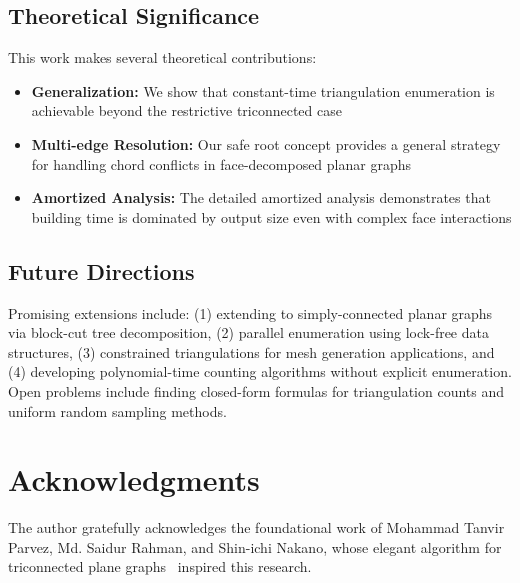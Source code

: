 \documentclass[12pt,a4paper]{article}
\theoremstyle{definition}
\theoremstyle{remark}
\begin{document}
\subsection{Theoretical Significance}

This work makes several theoretical contributions:

\begin{itemize}
    \item \textbf{Generalization:} We show that constant-time triangulation enumeration is achievable beyond the restrictive triconnected case
    \item \textbf{Multi-edge Resolution:} Our safe root concept provides a general strategy for handling chord conflicts in face-decomposed planar graphs
    \item \textbf{Amortized Analysis:} The detailed amortized analysis demonstrates that building time is dominated by output size even with complex face interactions
\end{itemize}

\subsection{Future Directions}

Promising extensions include: (1) extending to simply-connected planar graphs via block-cut tree decomposition, (2) parallel enumeration using lock-free data structures, (3) constrained triangulations for mesh generation applications, and (4) developing polynomial-time counting algorithms without explicit enumeration. Open problems include finding closed-form formulas for triangulation counts and uniform random sampling methods.

\section*{Acknowledgments}

The author gratefully acknowledges the foundational work of Mohammad Tanvir Parvez, Md. Saidur Rahman, and Shin-ichi Nakano, whose elegant algorithm for triconnected plane graphs~\cite{parvez2011} inspired this research.



\end{document}

